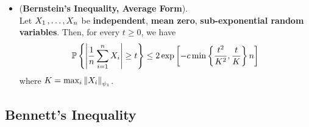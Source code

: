 \documentclass[11pt]{article}
\begin{document}
\begin{itemize}
\item \begin{corollary}(\textbf{Bernstein's Inequality, Average Form}).  \citep{vershynin2018high}\\
Let $X_1 \,{,}\ldots{,}\, X_n$ be \textbf{independent}, \textbf{mean zero}, \textbf{sub-exponential random variables}. Then, for every $t \ge 0$, we have
\begin{align}
{\mathbb P}\left\{\left\lvert \frac{1}{n}\sum_{i=1}^{n}X_i \right\rvert \ge t\right\} \le 2 \exp\left[- c \min\left\{\frac{t^2}{K^2},  \frac{t}{K}\right\}n\right] \label{ineqn: bernstein_inequality_average}
\end{align} where $K = \max_i \left\|X_i\right\|_{\psi_1}$.
\end{corollary}

\end{itemize}
\subsection{Bennett's Inequality}
\end{document}
